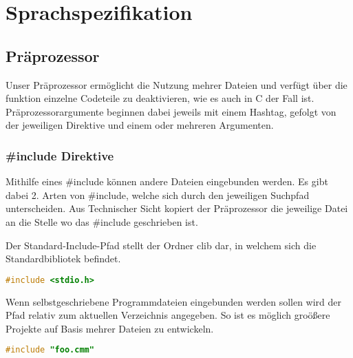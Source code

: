

\newpage
\section{Sprachspezifikation}

\subsection{Pr\"aprozessor}

Unser Pr\"aprozessor erm\"oglicht die Nutzung mehrer Dateien und verf\"ugt \"uber die funktion einzelne Codeteile zu deaktivieren, wie es auch in C der Fall ist. Pr\"aprozessorargumente beginnen dabei jeweils mit einem Hashtag, gefolgt von der jeweiligen Direktive und einem oder mehreren Argumenten.

\subsubsection{\#include Direktive}

Mithilfe eines \#include k\"onnen andere Dateien eingebunden werden. Es gibt dabei 2. Arten von \#include, welche sich durch den jeweiligen Suchpfad unterscheiden. Aus Technischer Sicht kopiert der Pr\"aprozessor die jeweilige Datei an die Stelle wo das \#include geschrieben ist.


Der Standard-Include-Pfad stellt der Ordner clib dar, in welchem sich die Standardbibliotek befindet.

\begin{lstlisting}[language=C]
#include <stdio.h>
\end{lstlisting}


Wenn selbstgeschriebene Programmdateien eingebunden werden sollen wird der Pfad relativ zum aktuellen Verzeichnis angegeben. So ist es m\"oglich gro\"o\ss{}ere Projekte auf Basis mehrer Dateien zu entwickeln.

\begin{lstlisting}[language=C]
#include "foo.cmm"
\end{lstlisting}

